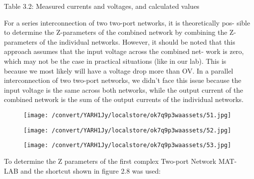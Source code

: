 \documentclass[12pt]{report}
\begin{document}
    Table 3.2: Measured currents and voltages, and calculated values 

\vspace{10pt}

    For a series interconnection of two two-port networks, it is theoretically pos-  sible to determine the Z-parameters of the combined network by combining  the Z-parameters of the individual networks. However, it should be noted  that this approach assumes that the input voltage across the combined net-  work is zero, which may not be the case in practical situations (like in our  lab). This is because we most likely will have a voltage drop more than OV.  In a parallel interconnection of two two-port networks, we didn’t face this  issue because the input voltage is the same across both networks, while the  output current of the combined network is the sum of the output currents of  the individual networks. 

\vspace{10pt}

\begin{figure}[h]

\texttt{[image: /convert/YARH1Jy/localstore/ok7q9p3waassets/51.jpg]}

\centering

\end{figure}

\par

\vspace{10pt}

\begin{figure}[h]

\texttt{[image: /convert/YARH1Jy/localstore/ok7q9p3waassets/52.jpg]}

\centering

\end{figure}

\begin{figure}[h]

\texttt{[image: /convert/YARH1Jy/localstore/ok7q9p3waassets/53.jpg]}

\centering

\end{figure}

    To determine the Z parameters of the first complex Two-port Network MAT-  LAB and the shortcut shown in figure 2.8 was used: 

\vspace{10pt}
\end{document}

